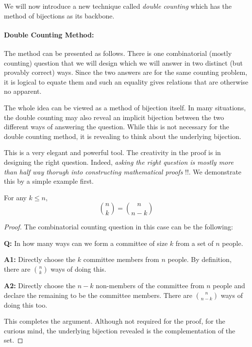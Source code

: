 We will now introduce a new technique called {\em double counting} which has the method of bijections as its backbone. 

\paragraph{Double Counting Method:} The method can be presented as follows. There is one combinatorial (mostly counting) question that we will design which we will answer in two distinct (but provably correct) ways. Since the two answers are for the same counting problem, it is logical to equate them and such an equality gives relations that are otherwise no apparent. 

The whole idea can be viewed as a method of bijection itself. In many situations, the double counting may also reveal an implicit bijection between the two different ways of answering the question. While this is not necessary for the double counting method, it is revealing to think about the underlying bijection.

This is a very elegant and powerful tool. The creativity in the proof is in designing the right question. Indeed, \textit{asking the right question is mostly more than half way thorugh into constructing mathematical proofs} !!.
We demonstrate this by a simple example first.

\begin{proposition}
For any $k \le n$,
$${n \choose k} = {n \choose n-k}$$
\end{proposition}
\begin{proof}
The combinatorial counting question in this case can be the following:
\begin{description}
\item{\bf Q:} In how many ways can we form a committee of size $k$ from a set of $n$ people.
\item{\bf A1:} Directly choose the $k$ committee members from $n$ people. By definition, there are ${n \choose k}$ ways of doing this.
\item{\bf  A2:} Directly choose the $n-k$ non-members of the committee from $n$ people and declare the remaining to be the committee members. There are ${n \choose n-k}$ ways of doing this too.
\end{description}
This completes the argument. Although not required for the proof, for the curious mind, the underlying bijection revealed is the complementation of the set.
\end{proof}

